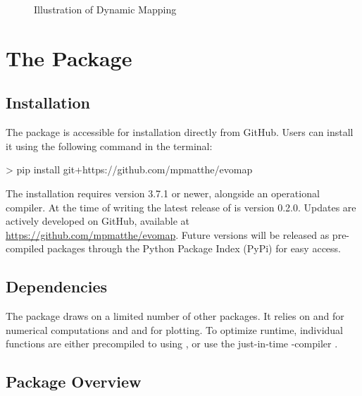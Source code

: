 \documentclass[article]{jss}
\begin{document}
\begin{figure}
  \centering
  \caption{\label{fig:dynamic-map-illustration} Illustration of Dynamic Mapping}
\end{figure}

\section[The evomap Package]{The  Package} \label{sec:package}

\subsection{Installation}

The  package is accessible for installation directly from GitHub. Users can install it using the following
 command in the terminal:

\begin{CodeChunk}
  \begin{CodeInput}
  > pip install git+https://github.com/mpmatthe/evomap
  \end{CodeInput}
\end{CodeChunk}

The installation requires  version 3.7.1 or
newer, alongside an operational  compiler. At the time of writing the latest release of  is 
version 0.2.0. Updates are actively developed on GitHub, available at \href{https://github.com/mpmatthe/evomap} 
{https://github.com/mpmatthe/evomap}. Future versions will be released as pre-compiled packages through the Python 
Package Index (PyPi) for easy access.

\subsection{Dependencies}

The  package draws on a limited number of other packages. It relies on  and  for 
numerical computations and  and  for plotting. To optimize runtime, individual functions 
are either precompiled to  using , or use the just-in-time -compiler .

\subsection{Package Overview}
\end{document}
